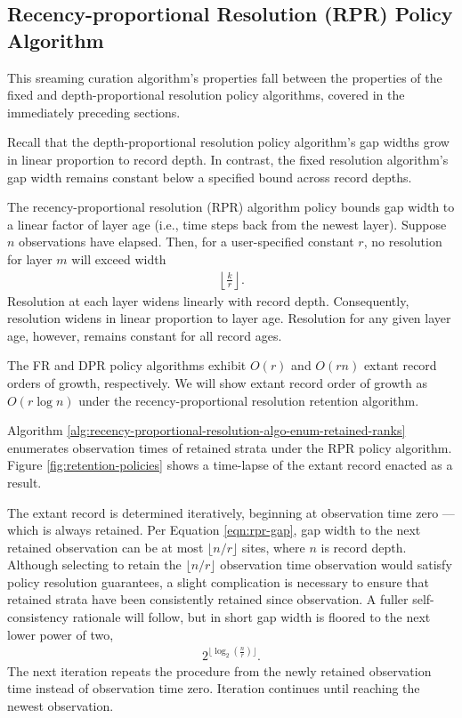 \subsection{Recency-proportional Resolution (RPR) Policy Algorithm}
\label{sec:recency-proportional-resolution-algo}

This sreaming curation algorithm's properties fall between the properties of the fixed and depth-proportional resolution policy algorithms, covered in the immediately preceding sections.

Recall that the depth-proportional resolution policy algorithm's gap widths grow in linear proportion to record depth.
In contrast, the fixed resolution algorithm's gap width remains constant below a specified bound across record depths.

The recency-proportional resolution (RPR) algorithm policy bounds gap width to a linear factor of layer age (i.e., time steps back from the newest layer).
Suppose $n$ observations have elapsed.
Then, for a user-specified constant $r$, no resolution for layer $m$ will exceed width
\begin{align}
  \left\lfloor \frac{k}{r} \right\rfloor.
  \label{eqn:rpr-gap}
\end{align}
Resolution at each layer widens linearly with record depth.
Consequently, resolution widens in linear proportion to layer age.
Resolution for any given layer age, however, remains constant for all record ages.

The FR and DPR policy algorithms exhibit $O(r)$ and $O(rn)$ extant record orders of growth, respectively.
We will show extant record order of growth as $O(r\log{n})$ under the recency-proportional resolution retention algorithm.

Algorithm \ref{alg:recency-proportional-resolution-algo-enum-retained-ranks} enumerates observation times of retained strata under the RPR policy algorithm.
Figure \ref{fig:retention-policies} shows a time-lapse of the extant record enacted as a result.

The extant record is determined iteratively, beginning at observation time zero --- which is always retained.
Per Equation \ref{eqn:rpr-gap}, gap width to the next retained observation can be at most $\lfloor n/r \rfloor$ sites, where $n$ is record depth.
Although selecting to retain the $\lfloor n/r \rfloor$ observation time observation would satisfy policy resolution guarantees, a slight complication is necessary to ensure that retained strata have been consistently retained since observation.
A fuller self-consistency rationale will follow, but in short gap width is floored to the next lower power of two,
\begin{align*}
  2^{\lfloor \log_{2}\left(\frac{n}{r}\right) \rfloor}.
\end{align*}
The next iteration repeats the procedure from the newly retained observation time instead of observation time zero.
Iteration continues until reaching the newest observation.


